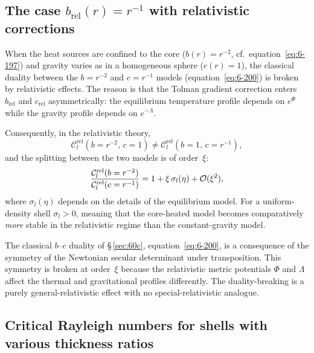 \subsection{The case $b_{\mathrm{rel}}(r) = r^{-1}$ with relativistic
  corrections}\label{sec:rel-60c}

When the heat sources are confined to the core ($b(r)=r^{-2}$,
cf.~equation~\eqref{eq:6-197}) and gravity varies as in a homogeneous
sphere ($c(r)=1$), the classical duality between the $b=r^{-2}$ and
$c=r^{-1}$ models (equation~\eqref{eq:6-200}) is broken by relativistic
effects.  The reason is that the Tolman gradient correction enters
$b_{\mathrm{rel}}$ and $c_{\mathrm{rel}}$ asymmetrically: the
equilibrium temperature profile depends on $e^{\Phi}$ while the
gravity profile depends on $e^{-\Lambda}$.

Consequently, in the relativistic theory,
\begin{equation}\label{eq:rel-60-31}
\mathcal{C}_{l}^{\mathrm{rel}}(b=r^{-2},\,c=1)
  \neq
\mathcal{C}_{l}^{\mathrm{rel}}(b=1,\,c=r^{-1}),
\end{equation}
and the splitting between the two models is of order~$\xi$:
\begin{equation}\label{eq:rel-60-32}
\frac{\mathcal{C}_{l}^{\mathrm{rel}}(b=r^{-2})}
     {\mathcal{C}_{l}^{\mathrm{rel}}(c=r^{-1})}
  = 1 + \xi\,\sigma_{l}(\eta) + \mathcal{O}(\xi^{2}),
\end{equation}
where $\sigma_{l}(\eta)$ depends on the details of the equilibrium
model.  For a uniform-density shell $\sigma_{l}>0$, meaning that the
core-heated model becomes comparatively \emph{more} stable in the
relativistic regime than the constant-gravity model.

\begin{relcorrection}
The classical $b$--$c$ duality of \S\,\ref{sec:60c},
equation~\eqref{eq:6-200}, is a consequence of the symmetry of the
Newtonian secular determinant under transposition.  This symmetry is
broken at order~$\xi$ because the relativistic metric potentials
$\Phi$ and $\Lambda$ affect the thermal and gravitational profiles
differently.  The duality-breaking is a purely general-relativistic
effect with no special-relativistic analogue.
\end{relcorrection}

\subsection{Critical Rayleigh numbers for shells with various
  thickness ratios}\label{sec:rel-60-thick}


